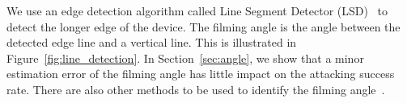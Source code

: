 We use an edge detection algorithm called Line Segment Detector (LSD)~\cite{grompone2010lsd} to detect the longer edge of the device.
The filming angle is the angle between the detected edge line and a vertical line. This is illustrated in Figure~\ref{fig:line_detection}.
In Section~\ref{sec:angle}, we show that a minor estimation error of the filming angle has little impact on the attacking success rate.
There are also other methods to be used to identify the filming angle~\cite{Torralba:2002:DEI:628330.628820}.

%

